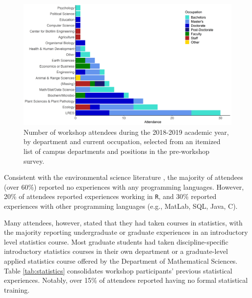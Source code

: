 \documentclass[12pt]{article}
\begin{document}
{
\begin{figure}[h!]
\centering
\includegraphics[width = \textwidth]{images/better_colors_attendance.png}
\caption{Number of workshop attendees during the 2018-2019 academic year, by
department and current occupation, selected from an itemized list of campus
departments and positions in the pre-workshop survey.}
    \label{fig:departments}
\end{figure}
}

\quad Consistent with the environmental science literature \citep{andelman, 
hampton, hernandez, carpentry}, the majority of attendees (over 60\%) reported
no experiences with any programming languages. However, 20\% of attendees 
reported experiences working in \texttt{R}, and 30\% reported experiences with
other programming languages (e.g., MatLab, SQL, Java, C). 

\quad Many attendees, however, stated that they had taken courses in statistics, 
with the majority reporting undergraduate or graduate experiences in an
introductory level statistics course. Most graduate students had taken 
discipline-specific introductory statistics courses in their own department or
a graduate-level applied statistics course offered by the Department of
Mathematical Sciences. Table \ref{tab:statistics} consolidates workshop
participants' previous statistical experiences. Notably, over 15\% of
attendees reported having no formal statistical training. 
\end{document}
